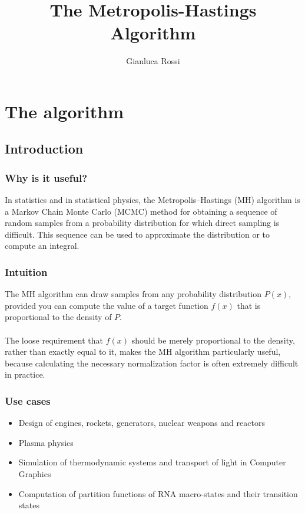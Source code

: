 \documentclass[11pt]{beamer}
\author{Gianluca Rossi}
\title{The Metropolis-Hastings Algorithm}
\begin{document}
\begin{frame}
	\titlepage
\end{frame}


\begin{frame}
	\tableofcontents
\end{frame}


\section{The algorithm}

\subsection{Introduction}

\begin{frame}
	\frametitle{Why is it useful?}
	In statistics and in statistical physics, the Metropolis–Hastings (MH) algorithm is a Markov Chain Monte Carlo (MCMC) method for obtaining a sequence of random samples from a probability distribution for which direct sampling is difficult. This sequence can be used to approximate the distribution or to compute an integral.
\end{frame}


\begin{frame}
	\frametitle{Intuition}
	The MH algorithm can draw samples from any probability distribution $P(x)$, provided you can compute the value of a target function $f(x)$ that is proportional to the density of $P$. \\~\\
	The loose requirement that $f(x)$ should be merely proportional to the density, rather than exactly equal to it, makes the MH algorithm particularly useful, because calculating the necessary normalization factor is often extremely difficult in practice.
\end{frame}


\begin{frame}
	\frametitle{Use cases}
	\begin{itemize}
		\item Design of engines, rockets, generators, nuclear weapons and reactors
		\item Plasma physics
		\item Simulation of thermodynamic systems and transport of light in Computer Graphics
		\item Computation of partition functions of RNA macro-states and their transition states
	\end{itemize}
\end{frame}
\end{document}
